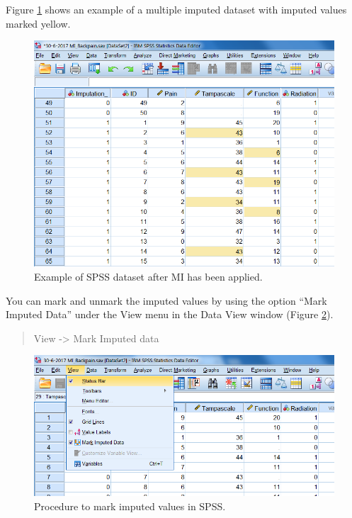 \documentclass[
]{book}
\begin{document}
Figure \ref{fig:fig5-1} shows an example of a multiple imputed dataset with imputed values marked yellow.

\begin{figure}

{\centering \includegraphics[width=0.9\linewidth]{images/fig5.1} 

}

\caption{Example of SPSS dataset after MI has been applied.}\label{fig:fig5-1}
\end{figure}

You can mark and unmark the imputed values by using the option ``Mark Imputed Data'' under the View menu in the Data View window (Figure \ref{fig:fig5-2}).

\begin{quote}
View -\textgreater{} Mark Imputed data
\end{quote}

\begin{figure}

{\centering \includegraphics[width=0.9\linewidth]{images/fig5.2} 

}

\caption{Procedure to mark imputed values in SPSS.}\label{fig:fig5-2}
\end{figure}
\end{document}
